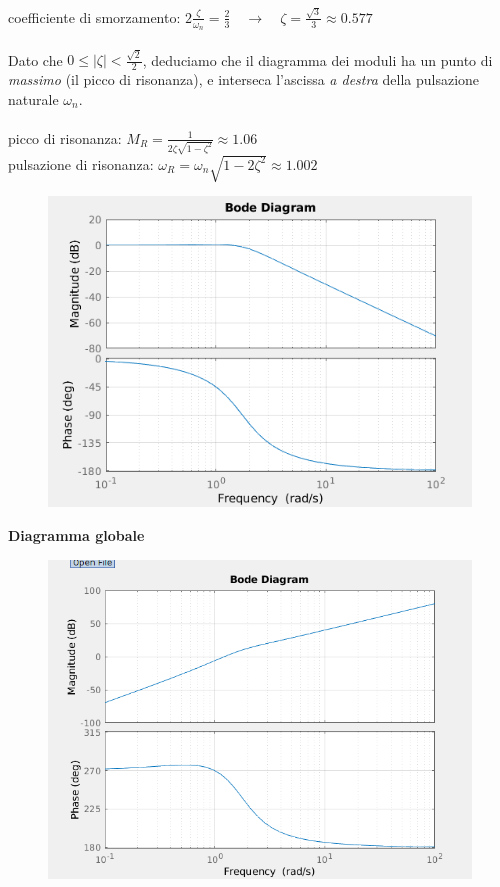 \documentclass[12pt,a4paper]{article}
\begin{document}
\begin{itemize}
		coefficiente di smorzamento: $2\frac{\zeta}{\omega_n} = \frac{2}{3}\quad\rightarrow \quad\zeta = \frac{\sqrt{3}}{3} \approx 0.577$\\\\
		Dato che $0 \leq |\zeta| < \frac{\sqrt{2}}{2}$, deduciamo che il diagramma dei moduli ha un punto di \textit{massimo} (il picco di risonanza), e interseca l'ascissa \textit{a destra} della pulsazione naturale $\omega_n$.\\\\
		picco di risonanza: $M_R = \frac{1}{2\zeta\sqrt{1-\zeta^2}} \approx 1.06$\\
		pulsazione di risonanza: $\omega_R = \omega_n\sqrt{1-2\zeta^2} \approx 1.002$\vspace{5px}
		\begin{figure}[h!]
			\centering
			\includegraphics[scale=0.5]{./images/bode42_4.png}
		\end{figure}
		\newpage
		\textbf{Diagramma globale}\\
		\begin{figure}[h!]
			\centering
			\includegraphics[scale=0.6]{./images/bode42_5.png}
		\end{figure}
	\end{itemize}
	\newpage
\end{document}
